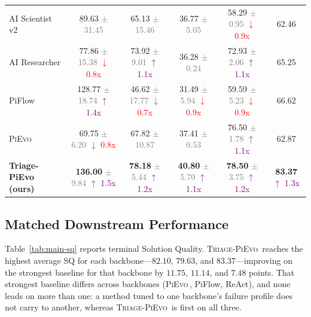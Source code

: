 \documentclass{article}
\newcommand{\method}{\textsc{Triage-PiEvo}\,}
\newcommand{\pievo}{\textsc{PiEvo}\,}
\begin{document}
\begin{table}[!ht]
{\begin{tabular}{l | cccc | c}
AI Scientist v2 & 89.63 \textcolor{gray}{\scriptsize $\pm$ 31.45} & 65.13 \textcolor{gray}{\scriptsize $\pm$ 15.46} & 36.77 \textcolor{gray}{\scriptsize $\pm$ 5.05} & 58.29 \textcolor{gray}{\scriptsize $\pm$ 0.95} \textcolor{red}{\scriptsize $\downarrow$ 0.9x} & 62.46  \\
AI Researcher & 77.86 \textcolor{gray}{\scriptsize $\pm$ 15.38} \textcolor{red}{\scriptsize $\downarrow$ 0.8x} & 73.92 \textcolor{gray}{\scriptsize $\pm$ 9.01} \textcolor{purple}{\scriptsize $\uparrow$ 1.1x} & 36.28 \textcolor{gray}{\scriptsize $\pm$ 0.24} & 72.93 \textcolor{gray}{\scriptsize $\pm$ 2.06} \textcolor{purple}{\scriptsize $\uparrow$ 1.1x} & 65.25  \\
PiFlow & 128.77 \textcolor{gray}{\scriptsize $\pm$ 18.74} \textcolor{purple}{\scriptsize $\uparrow$ 1.4x} & 46.62 \textcolor{gray}{\scriptsize $\pm$ 17.77} \textcolor{red}{\scriptsize $\downarrow$ 0.7x} & 31.49 \textcolor{gray}{\scriptsize $\pm$ 5.94} \textcolor{red}{\scriptsize $\downarrow$ 0.9x} & 59.59 \textcolor{gray}{\scriptsize $\pm$ 5.23} \textcolor{red}{\scriptsize $\downarrow$ 0.9x} & 66.62  \\
\pievo{} & 69.75 \textcolor{gray}{\scriptsize $\pm$ 6.20} \textcolor{red}{\scriptsize $\downarrow$ 0.8x} & 67.82 \textcolor{gray}{\scriptsize $\pm$ 10.87} & 37.41 \textcolor{gray}{\scriptsize $\pm$ 0.53} & 76.50 \textcolor{gray}{\scriptsize $\pm$ 1.78} \textcolor{purple}{\scriptsize $\uparrow$ 1.1x} & 62.87  \\
\textbf{Triage-PiEvo (ours)} & \textbf{136.00} \textcolor{gray}{\scriptsize $\pm$ 9.84} \textcolor{purple}{\scriptsize $\uparrow$ 1.5x} & \textbf{78.18} \textcolor{gray}{\scriptsize $\pm$ 5.44} \textcolor{purple}{\scriptsize $\uparrow$ 1.2x} & \textbf{40.80} \textcolor{gray}{\scriptsize $\pm$ 5.70} \textcolor{purple}{\scriptsize $\uparrow$ 1.1x} & \textbf{78.50} \textcolor{gray}{\scriptsize $\pm$ 3.75} \textcolor{purple}{\scriptsize $\uparrow$ 1.2x} & \textbf{83.37}  \textcolor{purple}{\scriptsize $\uparrow$ 1.3x} \\
\bottomrule
\end{tabular}%
}
\end{table}

\subsection{Matched Downstream Performance}
\label{sec:performance}

Table~\ref{tab:main-sq} reports terminal Solution Quality. \method{} reaches the highest average SQ for each backbone---$82.10$, $79.63$, and $83.37$---improving on the strongest baseline for that backbone by $11.75$, $11.14$, and $7.48$ points. That strongest baseline differs across backbones (\pievo{}, PiFlow, ReAct), and none leads on more than one: a method tuned to one backbone's failure profile does not carry to another, whereas \method{} is first on all three.
\end{document}
